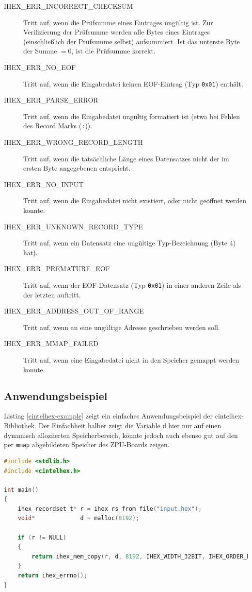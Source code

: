\documentclass[11pt]{scrartcl}
\begin{document}
\begin{description}
	\item[IHEX\_ERR\_INCORRECT\_CHECKSUM] Tritt auf, wenn die Prüfsumme eines Eintrages ungültig ist. Zur Verifizierung der Prüfsumme werden alle Bytes eines Eintrages (einschließlich der Prüfsumme selbst) aufsummiert. Ist das unterste Byte der Summe $=0$, ist die Prüfsumme korrekt.
	\item[IHEX\_ERR\_NO\_EOF] Tritt auf, wenn die Eingabedatei keinen EOF-Eintrag (Typ \texttt{0x01}) enthält.
	\item[IHEX\_ERR\_PARSE\_ERROR] Tritt auf, wenn die Eingabedatei ungültig formatiert ist (etwa bei Fehlen des Record Marks (\texttt{:})).
	\item[IHEX\_ERR\_WRONG\_RECORD\_LENGTH] Tritt auf, wenn die tatsächliche Länge eines Datensatzes nicht der im ersten Byte angegebenen entspricht.
	\item[IHEX\_ERR\_NO\_INPUT] Tritt auf, wenn die Eingabedatei nicht existiert, oder nicht geöffnet werden konnte.
	\item[IHEX\_ERR\_UNKNOWN\_RECORD\_TYPE] Tritt auf, wenn ein Datensatz eine ungültige Typ-Bezeichnung (Byte 4) hat).
	\item[IHEX\_ERR\_PREMATURE\_EOF] Tritt auf, wenn der EOF-Datensatz (Typ \texttt{0x01}) in einer anderen Zeile als der letzten auftritt.
	\item[IHEX\_ERR\_ADDRESS\_OUT\_OF\_RANGE] Tritt auf, wenn an eine ungültige Adresse geschrieben werden soll.
	\item[IHEX\_ERR\_MMAP\_FAILED] Tritt auf, wenn eine Eingabedatei nicht in den Speicher gemappt werden konnte.
\end{description}

\subsection{Anwendungsbeispiel}

Listing \ref{cintelhex-example} zeigt ein einfaches Anwendungsbeispiel der cintelhex-Bibliothek. Der Einfachheit halber zeigt die Variable \texttt{d} hier nur auf einen dynamisch alloziierten Speicherbereich, könnte jedoch auch ebenso gut auf den per \texttt{mmap} abgebildeten Speicher des ZPU-Boards zeigen.

\begin{lstlisting}[language=C,caption=Anwendungsbeispiel der cintelhex-Bibliothek,label=cintelhex-example]
#include <stdlib.h>
#include <cintelhex.h>

int main()
{
	ihex_recordset_t* r = ihex_rs_from_file("input.hex");
	void*             d = malloc(8192);
	
	if (r != NULL)
	{
		return ihex_mem_copy(r, d, 8192, IHEX_WIDTH_32BIT, IHEX_ORDER_BIGENDIAN);
	}
	return ihex_errno();
}
\end{lstlisting}
\end{document}
